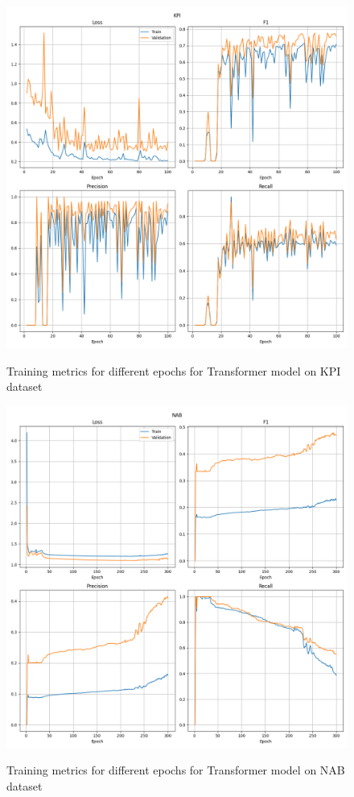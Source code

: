 \documentclass[a4paper, twoside]{report}
\theoremstyle{definition}
\numberwithin{equation}{section}
\begin{document}
\begin{figure}[h!]
    \centering
    \caption{Training metrics for different epochs for Transformer model on KPI dataset}
    \includegraphics[width=\textwidth]{plots/Transformer_KPI.png}
    \label{fig:Transformer_KPI_training}
\end{figure}

\begin{figure}[h!]
    \centering
    \caption{Training metrics for different epochs for Transformer model on NAB dataset}
    \includegraphics[width=\textwidth]{plots/Transformer_NAB.png}
    \label{fig:Transformer_NAB_training}
\end{figure}
\end{document}
